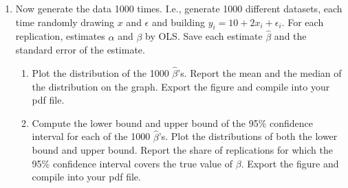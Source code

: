 \documentclass[11pt, a4paper]{article} %
\begin{document}
\begin{enumerate}
    \item Now generate the data 1000 times.  I.e., generate 1000 different datasets, each time randomly drawing $x$ and $\epsilon$ and building $y_i = 10 + 2x_i + \epsilon_i$.  For each replication, estimates $\alpha$ and $\beta$ by OLS.  Save each estimate $\hat\beta$ and the standard error of the estimate.  
    
        \begin{enumerate}
            \item Plot the distribution of the 1000 $\hat\beta$'s.  Report the mean and the median of the distribution on the graph.  Export the figure and compile into your pdf file.
            
            \item Compute the lower bound and upper bound of the 95\% confidence interval for each of the 1000 $\hat\beta$'s.  Plot the distributions of both the  lower bound and upper bound.  Report the share of replications for which the 95\% confidence interval covers the true value of $\beta$.  Export the figure and compile into your pdf file.
            
        \end{enumerate}
    \end{enumerate}
\end{document}
